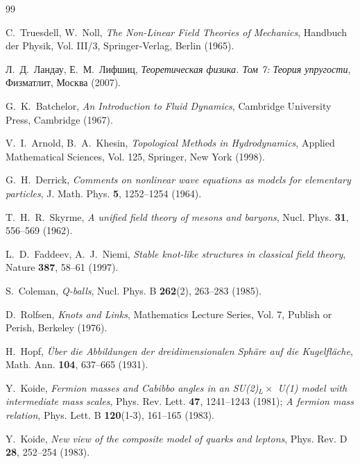 \documentclass[12pt,a4paper]{article}
\theoremstyle{definition}
\theoremstyle{remark}
\begin{document}
\begin{thebibliography}{99}
	
	C.~Truesdell, W.~Noll, \textit{The Non-Linear Field Theories of Mechanics}, Handbuch der Physik, Vol. III/3, Springer-Verlag, Berlin (1965).
	
	Л.~Д.~Ландау, Е.~М.~Лифшиц, \textit{Теоретическая физика. Том 7: Теория упругости}, Физматлит, Москва (2007).
	
	G.~K.~Batchelor, \textit{An Introduction to Fluid Dynamics}, Cambridge University Press, Cambridge (1967).
	
	V.~I.~Arnold, B.~A.~Khesin, \textit{Topological Methods in Hydrodynamics}, Applied Mathematical Sciences, Vol. 125, Springer, New York (1998).
	
	G.~H.~Derrick, \textit{Comments on nonlinear wave equations as models for elementary particles}, J. Math. Phys. \textbf{5}, 1252--1254 (1964).
	
	T.~H.~R.~Skyrme, \textit{A unified field theory of mesons and baryons}, Nucl. Phys. \textbf{31}, 556--569 (1962).
	
	L.~D.~Faddeev, A.~J.~Niemi, \textit{Stable knot-like structures in classical field theory}, Nature \textbf{387}, 58--61 (1997).
	
	S.~Coleman, \textit{Q-balls}, Nucl. Phys. B \textbf{262}(2), 263--283 (1985).
	
	D.~Rolfsen, \textit{Knots and Links}, Mathematics Lecture Series, Vol. 7, Publish or Perish, Berkeley (1976).
	
	H.~Hopf, \textit{\"Uber die Abbildungen der dreidimensionalen Sph\"are auf die Kugelfl\"ache}, Math. Ann. \textbf{104}, 637--665 (1931).
	
	Y.~Koide, \textit{Fermion masses and Cabibbo angles in an SU(2)$_L \times$ U(1) model with intermediate mass scales}, Phys. Rev. Lett. \textbf{47}, 1241--1243 (1981); \textit{A fermion mass relation}, Phys. Lett. B \textbf{120}(1-3), 161--165 (1983).
	
	Y.~Koide, \textit{New view of the composite model of quarks and leptons}, Phys. Rev. D \textbf{28}, 252--254 (1983).
	

\end{thebibliography}
\end{document}

